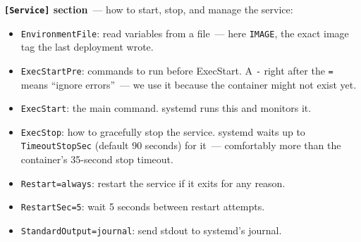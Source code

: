 \begin{codebox}[short]

\begin{Shaded}
\begin{Highlighting}[]
\KeywordTok{[Service]}
\OtherTok{=}
\OtherTok{=}
\OtherTok{=}
\OtherTok{=}
\OtherTok{=}
\OtherTok{=}
\OtherTok{=}
\OtherTok{=}
\OtherTok{=}
\OtherTok{=}
\end{Highlighting}
\end{Shaded}

\end{codebox}

\noindent{}\textbf{\texttt{{[}Service{]}} section}~--- how to start, stop, and manage the service:

\begin{itemize}
\tightlist
\item
  \texttt{EnvironmentFile}: read variables from a file~--- here \texttt{IMAGE}, the exact image tag the last deployment wrote.
\item
  \texttt{ExecStartPre}: commands to run before ExecStart. A \texttt{-} right after the \texttt{=} means ``ignore errors''~--- we use it because the container might not exist yet.
\item
  \texttt{ExecStart}: the main command. systemd runs this and monitors it.
\item
  \texttt{ExecStop}: how to gracefully stop the service. systemd waits up to \texttt{TimeoutStopSec} (default 90 seconds) for it~--- comfortably more than the container's 35-second stop timeout.
\item
  \texttt{Restart=always}: restart the service if it exits for any reason.
\item
  \texttt{RestartSec=5}: wait 5 seconds between restart attempts.
\item
  \texttt{StandardOutput=}\allowbreak{}\texttt{journal}: send stdout to systemd's journal.
\end{itemize}

